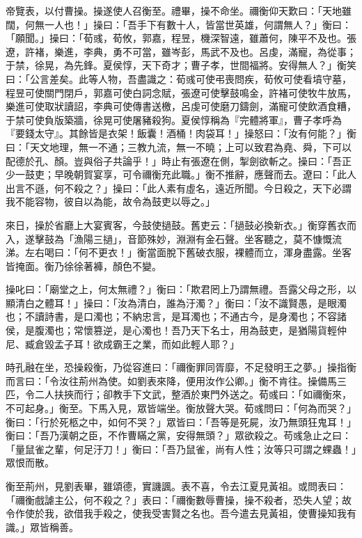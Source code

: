 帝覽表，以付曹操。操遂使人召衡至。禮畢，操不命坐。禰衡仰天歎曰：「天地雖闊，何無一人也！」操曰：「吾手下有數十人，皆當世英雄，何謂無人？」衡曰：「願聞。」操曰：「荀彧，荀攸，郭嘉，程昱，機深智遠，雖蕭何，陳平不及也。張遼，許褚，樂進，李典，勇不可當，雖岑彭，馬武不及也。呂虔，滿寵，為從事；于禁，徐晃，為先鋒。夏侯惇，天下奇才；曹子孝，世間福將。安得無人？」衡笑曰：「公言差矣。此等人物，吾盡識之：荀彧可使弔喪問疾，荀攸可使看墳守墓，程昱可使關門閉戶，郭嘉可使白詞念賦，張遼可使擊鼓鳴金，許褚可使牧牛放馬，樂進可使取狀讀詔，李典可使傳書送檄，呂虔可使磨刀鑄劍，滿寵可使飲酒食糟，于禁可使負版築牆，徐晃可使屠豬殺狗。夏侯惇稱為『完體將軍』，曹子孝呼為『要錢太守』。其餘皆是衣架！飯囊！酒桶！肉袋耳！」操怒曰：「汝有何能？」衡曰：「天文地理，無一不通；三教九流，無一不曉；上可以致君為堯、舜，下可以配德於孔、顏。豈與俗子共論乎！」時止有張遼在側，掣劍欲斬之。操曰：「吾正少一鼓吏；早晚朝賀宴享，可令禰衡充此職。」衡不推辭，應聲而去。遼曰：「此人出言不遜，何不殺之？」操曰：「此人素有虛名，遠近所聞。今日殺之，天下必謂我不能容物，彼自以為能，故令為鼓吏以辱之。」

來日，操於省廳上大宴賓客，今鼓使撾鼓。舊吏云：「撾鼓必換新衣。」衡穿舊衣而入，遂擊鼓為「漁陽三撾」，音節殊妙，淵淵有金石聲。坐客聽之，莫不慷慨流涕。左右喝曰：「何不更衣！」衡當面脫下舊破衣服，裸體而立，渾身盡露。坐客皆掩面。衡乃徐徐著褲，顏色不變。

操叱曰：「廟堂之上，何太無禮？」衡曰：「欺君罔上乃謂無禮。吾露父母之形，以顯清白之體耳！」操曰：「汝為清白，誰為汙濁？」衡曰：「汝不識賢愚，是眼濁也；不讀詩書，是口濁也；不納忠言，是耳濁也；不通古今，是身濁也；不容諸侯，是腹濁也；常懷篡逆，是心濁也！吾乃天下名士，用為鼓吏，是猶陽貨輕仲尼、臧倉毀孟子耳！欲成霸王之業，而如此輕人耶？」

時孔融在坐，恐操殺衡，乃從容進曰：「禰衡罪同胥靡，不足發明王之夢。」操指衡而言曰：「令汝往荊州為使。如劉表來降，便用汝作公卿。」衡不肯往。操備馬三匹，令二人扶挾而行；卻教手下文武，整酒於東門外送之。荀彧曰：「如禰衡來，不可起身。」衡至。下馬入見，眾皆端坐。衡放聲大哭。荀彧問曰：「何為而哭？」衡曰：「行於死柩之中，如何不哭？」眾皆曰：「吾等是死屍，汝乃無頭狂鬼耳！」衡曰：「吾乃漢朝之臣，不作曹瞞之黨，安得無頭？」眾欲殺之。苟彧急止之曰：「量鼠雀之輩，何足汙刀！」衡曰：「吾乃鼠雀，尚有人性；汝等只可謂之蜾蟲！」眾恨而散。

衡至荊州，見劉表畢，雖頌德，實譏諷。表不喜，令去江夏見黃祖。或問表曰：「禰衡戲謔主公，何不殺之？」表曰：「禰衡數辱曹操，操不殺者，恐失人望；故令作使於我，欲借我手殺之，使我受害賢之名也。吾今遣去見黃祖，使曹操知我有識。」眾皆稱善。

